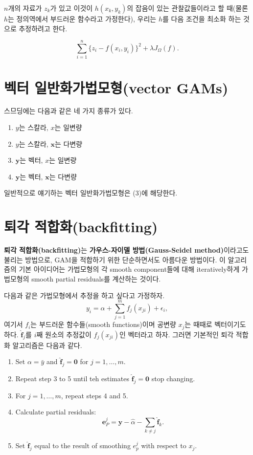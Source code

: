 \documentclass[b5paper,]{scrbook}
\theoremstyle{plain}
\theoremstyle{definition}
\numberwithin{equation}{section}
\begin{document}
\(n\)개의 자료가 \(z_{k}\)가 있고 이것이 \(h(x_{k},y_{k})\)의 잡음이
있는 관찰값들이라고 할 때(물론 \(h\)는 정의역에서 부드러운 함수라고
가정한다), 우리는 \(h\)를 다음 조건을 최소화 하는 것으로 추정하려고
한다.

\begin{equation}
\sum_{i=1}^{n}\{ z_{i}-f(x_{i},y_{i})\}^{2}+\lambda J_{\Omega}(f).
\label{eq:soapfilmsmoothing}
\end{equation}

\section{벡터 일반화가법모형(vector GAMs)}\label{-vector-gams}

스므딩에는 다음과 같은 네 가지 종류가 있다.

\begin{enumerate}
\def\labelenumi{\arabic{enumi}.}
\item
  \(y\)는 스칼라, \(x\)는 일변량
\item
  \(y\)는 스칼라, \(\mathbf{x}\)는 다변량
\item
  \(\mathbf{y}\)는 벡터, \(x\)는 일변량
\item
  \(\mathbf{y}\)는 벡터, \(\mathbf{x}\)는 다변량
\end{enumerate}

일반적으로 얘기하는 벡터 일반화가법모형은 (3)에 해당한다.

\section{퇴각 적합화(backfitting)}\label{-backfitting}

\textbf{퇴각 적합화(backfitting)}는 \textbf{가우스-자이델
방법(Gauss-Seidel method)}이라고도 불리는 방법으로, GAM을 적합하기 위한
단순하면서도 아름다운 방법이다. 이 알고리즘의 기본 아이디어는 가법모형의
각 smooth component들에 대해 iteratively하게 가법모형의 smooth partial
residuals를 계산하는 것이다.

다음과 같은 가법모형에서 추정을 하고 싶다고 가정하자.
\[y_{i}=\alpha + \sum_{j=1}^{m}f_{j}(x_{ji})+\epsilon_{i},\] 여기서
\(f_{i}\)는 부드러운 함수들(smooth functions)이며 공변량 \(x_{j}\)는
때때로 벡터이기도 하다. \(\hat{\mathbf{f}}_{j}\)를 \(i\)째 원소의
추정값이 \(f_{j}(x_{ji})\)인 벡터라고 하자. 그러면 기본적인 퇴각 적합화
알고리즘은 다음과 같다.

\begin{enumerate}
\def\labelenumi{\arabic{enumi}.}
\item
  Set \(\alpha=\bar{y}\) and \(\hat{\mathbf{f}}_{j}=\mathbf{0}\) for
  \(j=1,\ldots , m\).
\item
  Repeat step 3 to 5 until teh estimates
  \(\hat{\mathbf{f}}_{j}=\mathbf{0}\) stop changing.
\item
  For \(j=1,\ldots ,m\), repeat steps 4 and 5.
\item
  Calculate partial residuals:
  \[\mathbf{e}_{P}^{j}=\mathbf{y}-\hat{\alpha}-\sum_{k\neq j}\hat{\mathbf{f}}_{k}.\]
\item
  Set \(\hat{\mathbf{f}}_{j}\) equal to the result of smoothing
  \(e_{p}^{j}\) with respect to \(x_{j}\).
\end{enumerate}
\end{document}
